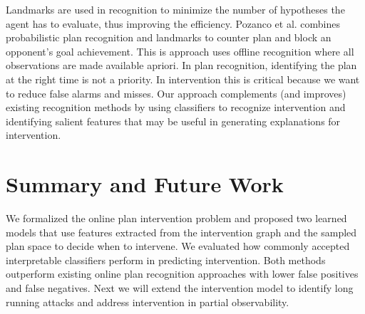 \documentclass[letterpaper]{article}
\theoremstyle{plain}
\begin{document}
Landmarks are used in recognition to minimize the number of hypotheses the agent has to evaluate, thus improving the efficiency. Pozanco et al.  combines probabilistic plan recognition and landmarks to counter plan and block an opponent's goal achievement. This is approach uses offline recognition where all observations are made available apriori. In plan recognition, identifying the plan at the right time is not a priority. In intervention this is critical because we want to reduce false alarms and misses. Our approach complements (and improves) existing recognition methods by using classifiers to recognize intervention and identifying salient features that may be useful in generating explanations for intervention.

\section{Summary and Future Work}
We formalized the online plan intervention problem and proposed two learned models that use features extracted from the intervention graph and the sampled plan space to decide when to intervene. We evaluated how commonly accepted interpretable classifiers perform in predicting intervention. Both methods outperform existing online plan recognition approaches with lower false positives and false negatives. Next we will extend the intervention model to identify long running attacks and address intervention in partial observability.
\clearpage %
\begin{small}


\end{small}
\end{document}

